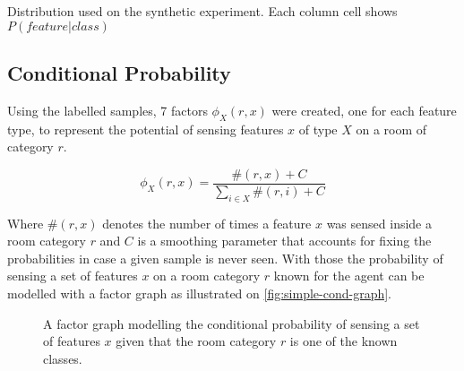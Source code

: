 \begin{sidewaystable}[h]
\begin{center}
\scalebox{0.40}{}
\end{center}
\caption{\label{extra:synthetic-distribution}Distribution used on the synthetic experiment. Each column cell shows $P(feature|class)$}
\end{sidewaystable}


\subsection{Conditional Probability}
Using the labelled samples, 7 factors $\phi_X(r,x)$ were created, one for each
feature type, to represent the potential of sensing features $x$ of type $X$ on
a room of category $r$.

\begin{equation}
\phi_X(r,x) = \frac{\#(r,x)+C}{\sum_{i \in X}{\#(r,i)+C}}
\end{equation}

Where $\#(r,x)$ denotes the number of times a feature $x$ was sensed inside a
room category $r$ and $C$ is a smoothing parameter that accounts for fixing
the probabilities in case a given sample is never seen.
With those the probability of sensing a set of features $x$ on a room category
$r$ known for the agent can be modelled with a factor graph as illustrated on
\autoref{fig:simple-cond-graph}.

\begin{figure}[h]
\centering
{}
\caption{\label{fig:simple-cond-graph}A factor graph modelling the conditional
probability of sensing a set of features $x$ given that the room category $r$ is
one of the known classes.}
\end{figure}

